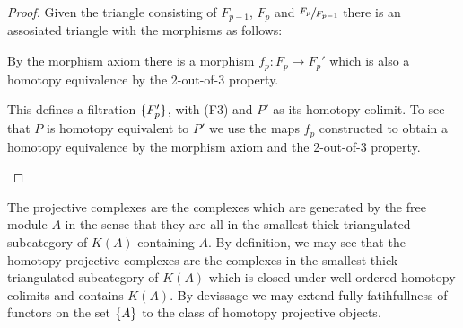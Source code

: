\documentclass[../thesis.tex]{subfiles}
\begin{document}
\begin{proof}
                Given the triangle consisting of $F_{p-1}$, $F_p$ and $\sfrac{F_p}{F_{p-1}}$ there is an assosiated triangle with the morphisms as follows:
                \begin{center}
                \end{center}

                By the morphism axiom there is a morphism $f_p : F_p \rightarrow F_{p}'$ which is also a homotopy equivalence by the 2-out-of-3 property.

                This defines a filtration $\{F_p'\}$, with (F3) and $P'$ as its homotopy colimit. To see that $P$ is homotopy equivalent to $P'$ we use the maps $f_p$ constructed to obtain a homotopy equivalence by the morphism axiom and the 2-out-of-3 property.

                \begin{center}
                \end{center}
            \end{proof}

            The projective complexes are the complexes which are generated by the free module $A$ in the sense that they are all in the smallest thick triangulated subcategory of $K(A)$ containing $A$. By definition, we may see that the homotopy projective complexes are the complexes in the smallest thick triangulated subcategory of $K(A)$ which is closed under well-ordered homotopy colimits and contains $K(A)$. By devissage we may extend fully-fatihfullness of functors on the set $\{A\}$ to the class of homotopy projective objects.
\end{document}
